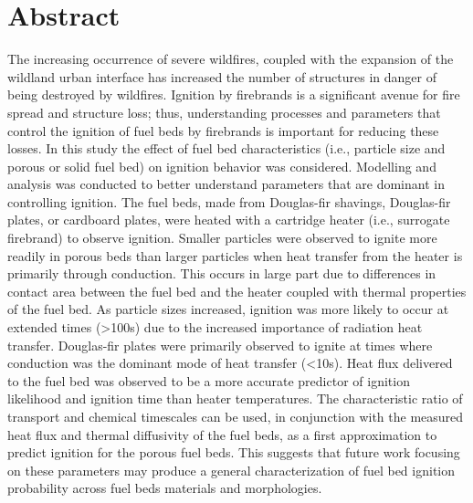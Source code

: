 \section{Abstract}
    The increasing occurrence of severe wildfires, coupled with the expansion of the wildland urban interface has increased the number of structures in danger of being destroyed by wildfires. Ignition by firebrands is a significant avenue for fire spread and structure loss; thus, understanding processes and parameters that control the ignition of fuel beds by firebrands is important for reducing these losses. In this study the effect of fuel bed characteristics (i.e., particle size and porous or solid fuel bed) on ignition behavior was considered.  Modelling and analysis was conducted to better understand parameters that are dominant in controlling ignition. The fuel beds, made from Douglas-fir shavings, Douglas-fir plates, or cardboard plates, were heated with a cartridge heater (i.e., surrogate firebrand) to observe ignition. Smaller particles were observed to ignite more readily in porous beds than larger particles when heat transfer from the heater is primarily through conduction. This occurs in large part due to differences in contact area between the fuel bed and the heater coupled  with thermal properties of the fuel bed. As particle sizes increased, ignition was more likely to occur at extended times (\textgreater 100\si{\second}) due to the increased importance of radiation heat transfer. Douglas-fir plates were primarily observed to ignite at times where conduction was the dominant mode of heat transfer (\textless 10\si{\second}). Heat flux delivered to the fuel bed was observed to be a more accurate predictor of ignition likelihood and ignition time than heater temperatures. The characteristic ratio of transport and chemical timescales can be used, in conjunction with the measured heat flux and thermal diffusivity of the fuel beds, as a first approximation to predict ignition for the porous fuel beds. This suggests that future work focusing on these parameters may produce a general characterization of fuel bed ignition probability across fuel beds materials and morphologies.  

